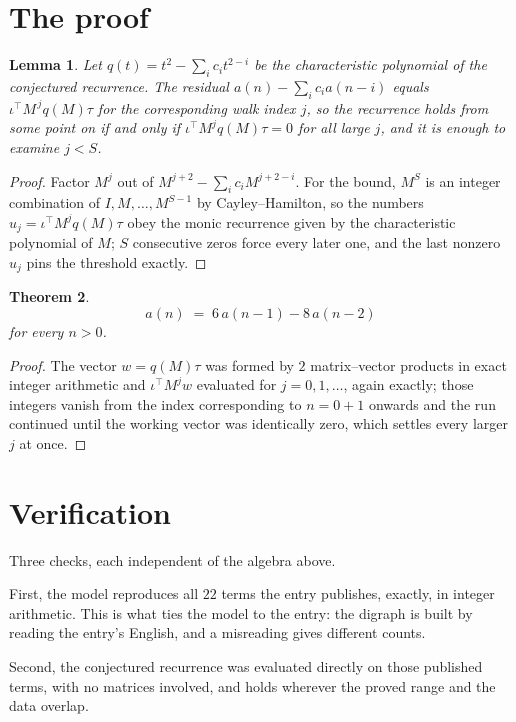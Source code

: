 \documentclass[11pt,a4paper]{article}
\theoremstyle{plain}
\newtheorem{theorem}{Theorem}
\newtheorem{lemma}[theorem]{Lemma}
\theoremstyle{definition}
\begin{document}
\section{The proof}

\begin{lemma}\label{lem:crit}
Let $q(t)=t^{2}-\sum_i c_it^{2-i}$ be the characteristic polynomial of the
conjectured recurrence. The residual $a(n)-\sum_ic_ia(n-i)$ equals
$\iota^{\!\top}M^{\,j}q(M)\tau$ for the corresponding walk index $j$, so the recurrence
holds from some point on if and only if $\iota^{\!\top}M^{j}q(M)\tau=0$ for all large $j$,
and it is enough to examine $j<S$.
\end{lemma}

\begin{proof}
Factor $M^{j}$ out of $M^{j+2}-\sum_ic_iM^{j+2-i}$. For the bound, $M^{S}$
is an integer combination of $I,M,\dots,M^{S-1}$ by Cayley--Hamilton, so the numbers
$u_j=\iota^{\!\top}M^{j}q(M)\tau$ obey the monic recurrence given by the characteristic
polynomial of $M$; $S$ consecutive zeros force every later one, and the last nonzero $u_j$
pins the threshold exactly.
\end{proof}

\begin{theorem}
\[
a(n)\;=\;6\,a(n-1) - 8\,a(n-2)
\]
for every $n>0$.
\end{theorem}

\begin{proof}
The vector $w=q(M)\tau$ was formed by $2$ matrix--vector products in exact integer
arithmetic and $\iota^{\!\top}M^{j}w$ evaluated for $j=0,1,\dots$, again exactly; those
integers vanish from the index corresponding to $n=0+1$ onwards and the run continued
until the working vector was identically zero, which settles every larger $j$ at once.
\end{proof}

\section{Verification}

Three checks, each independent of the algebra above.

First, the model reproduces all $22$ terms the entry publishes, exactly, in integer
arithmetic. This is what ties the model to the entry: the digraph is built by reading the
entry's English, and a misreading gives different counts.

Second, the conjectured recurrence was evaluated directly on those published terms, with no
matrices involved, and holds wherever the proved range and the data overlap.
\end{document}
